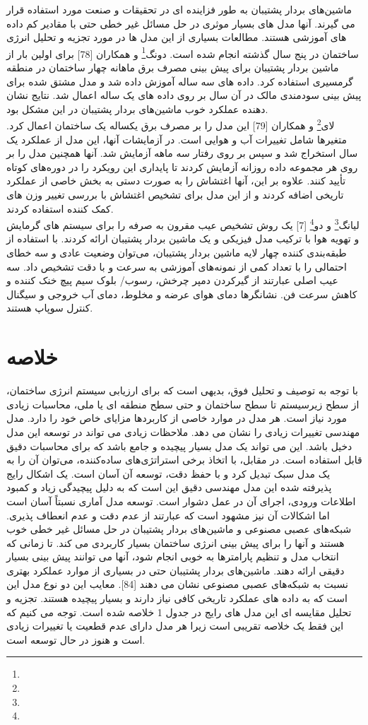 ماشین‌های بردار پشتیبان به طور فزاینده ای در تحقیقات و صنعت مورد استفاده قرار می گیرند. آنها مدل های بسیار موثری در حل مسائل غیر خطی حتی با مقادیر کم داده های آموزشی هستند. مطالعات بسیاری از این مدل ها در مورد تجزیه و تحلیل انرژی ساختمان در پنج سال گذشته انجام شده است.
دونگ\footnote{} و همکاران [78] برای اولین بار از ماشین بردار پشتیبان برای پیش بینی مصرف برق ماهانه چهار ساختمان در منطقه گرمسیری استفاده کرد. داده های سه ساله آموزش داده شد و مدل مشتق شده برای پیش بینی سودمندی مالک در آن سال بر روی داده های یک ساله اعمال شد. نتایج نشان دهنده عملکرد خوب ماشین‌های بردار پشتیبان در این مشکل بود.
\\
لای\footnote{} و همکاران [79] این مدل را بر مصرف برق یکساله یک ساختمان اعمال کرد. متغیرها شامل تغییرات آب و هوایی است. در آزمایشات آنها، این مدل از عملکرد یک سال استخراج شد و سپس بر روی رفتار سه ماهه آزمایش شد. آنها همچنین مدل را بر روی هر مجموعه داده روزانه آزمایش کردند تا پایداری این رویکرد را در دوره‌های کوتاه تأیید کنند. علاوه بر این، آنها اغتشاش را به صورت دستی به بخش خاصی از عملکرد تاریخی اضافه کردند و از این مدل برای تشخیص اغتشاش با بررسی تغییر وزن های کمک کننده استفاده کردند.
\\
لیانگ\footnote{} و دو\footnote{} [7] یک روش تشخیص عیب مقرون به صرفه را برای سیستم های گرمایش و تهویه هوا با ترکیب مدل فیزیکی و یک ماشین بردار پشتیبان ارائه کردند. با استفاده از طبقه‌بندی کننده چهار لایه ماشین بردار پشتیبان، می‌توان وضعیت عادی و سه خطای احتمالی را با تعداد کمی از نمونه‌های آموزشی به سرعت و با دقت تشخیص داد. سه عیب اصلی عبارتند از گیرکردن دمپر چرخش، رسوب/ بلوک سیم پیچ خنک کننده و کاهش سرعت فن. نشانگرها دمای هوای عرضه و مخلوط، دمای آب خروجی و سیگنال کنترل سوپاپ هستند.


\section{خلاصه}

با توجه به توصیف و تحلیل فوق، بدیهی است که برای ارزیابی سیستم انرژی ساختمان، از سطح زیرسیستم تا سطح ساختمان و حتی سطح منطقه ای یا ملی، محاسبات زیادی مورد نیاز است. هر مدل در موارد خاصی از کاربردها مزایای خاص خود را دارد. مدل مهندسی تغییرات زیادی را نشان می دهد. ملاحظات زیادی می تواند در توسعه این مدل دخیل باشد. این می تواند یک مدل بسیار پیچیده و جامع باشد که برای محاسبات دقیق قابل استفاده است. در مقابل، با اتخاذ برخی استراتژی‌های ساده‌کننده، می‌توان آن را به یک مدل سبک تبدیل کرد و با حفظ دقت، توسعه آن آسان است. یک اشکال رایج پذیرفته شده این مدل مهندسی دقیق این است که به دلیل پیچیدگی زیاد و کمبود اطلاعات ورودی، اجرای آن در عمل دشوار است. توسعه مدل آماری نسبتاً آسان است اما اشکالات آن نیز مشهود است که عبارتند از عدم دقت و عدم انعطاف پذیری. شبکه‌های عصبی مصنوعی و ماشین‌های بردار پشتیبان در حل مسائل غیر خطی خوب هستند و آنها را برای پیش بینی انرژی ساختمان بسیار کاربردی می کند. تا زمانی که انتخاب مدل و تنظیم پارامترها به خوبی انجام شود، آنها می توانند پیش بینی بسیار دقیقی ارائه دهند. ماشین‌های بردار پشتیبان حتی در بسیاری از موارد عملکرد بهتری نسبت به شبکه‌های عصبی مصنوعی نشان می دهند [84]. معایب این دو نوع مدل این است که به داده های عملکرد تاریخی کافی نیاز دارند و بسیار پیچیده هستند. تجزیه و تحلیل مقایسه ای این مدل های رایج در جدول 1 خلاصه شده است. توجه می کنیم که این فقط یک خلاصه تقریبی است زیرا هر مدل دارای عدم قطعیت یا تغییرات زیادی است و هنوز در حال توسعه است.